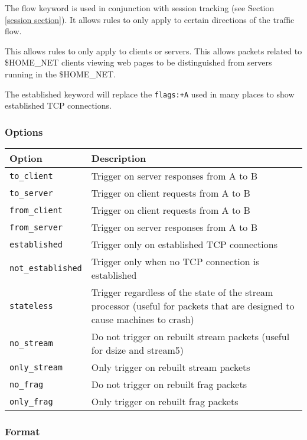 \documentclass[english]{report}
\begin{document}
The flow keyword is used in conjunction with session tracking (see Section
\ref{session section}). It allows rules to only apply to certain directions of
the traffic flow. 

This allows rules to only apply to clients or servers. This allows packets
related to \$HOME\_NET clients viewing web pages to be distinguished from
servers running in the \$HOME\_NET.

The established keyword will replace the \texttt{flags:+A} used in many places
to show established TCP connections.

\subsubsection*{Options}

\begin{tabular}{| l | p{4.5in} |}
\hline
{\bf Option} & {\bf Description}\\
\hline
\hline
\texttt{to\_client} & Trigger on server responses from A to B\\
\hline
\texttt{to\_server} & Trigger on client requests from A to B\\
\hline
\texttt{from\_client} & Trigger on client requests from A to B\\
\hline
\texttt{from\_server} & Trigger on server responses from A to B\\
\hline
\texttt{established} & Trigger only on established TCP connections\\
\hline
\texttt{not\_established} & Trigger only when no TCP connection is established\\
\hline
\texttt{stateless} & Trigger regardless of the state of the stream processor
(useful for packets that are designed to cause machines to crash)\\
\hline
\texttt{no\_stream} & Do not trigger on rebuilt stream packets (useful 
for dsize and stream5)\\
\hline
\texttt{only\_stream} & Only trigger on rebuilt stream
packets\\
\hline
\texttt{no\_frag} & Do not trigger on rebuilt frag packets\\
\hline
\texttt{only\_frag} & Only trigger on rebuilt frag packets\\
\hline
\end{tabular}

\subsubsection{Format}
\end{document}
